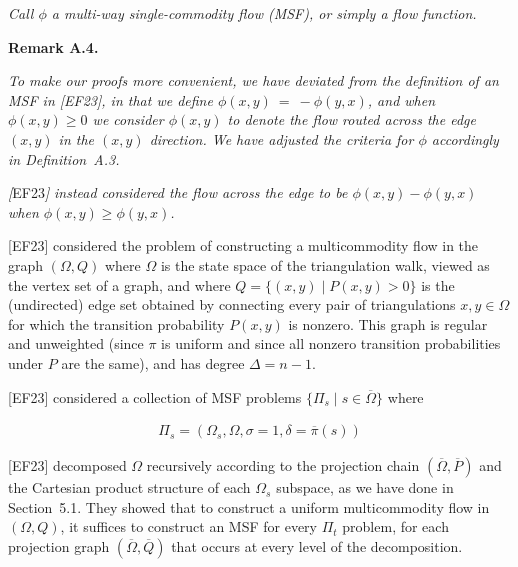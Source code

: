 \documentclass[10pt,a4paper]{article}
\begin{document}
\emph{Call $\phi$ a multi-way single-commodity flow (MSF), or simply a flow function.}\par







\par\medskip\noindent\textbf{\textbf{Remark A.4}\textbf{.}}\par



\emph{To make our proofs more convenient, we have deviated from the definition of an MSF in [EF23], in that we define $\phi(x,y)~=~-\phi(y,x)$, and when $\phi(x,y)\geq 0$ we consider $\phi(x,y)$ to denote the flow routed across the edge $(x,y)$ in the $(x,y)$ direction. We have adjusted the criteria for $\phi$ accordingly in Definition A.3.}\par




\emph{[}EF23\emph{]}\emph{ instead considered the flow across the edge to be $\phi(x,y)-\phi(y,x)$ when $\phi(x,y)\geq\phi(y,x)$.}\par






[EF23] considered the problem of constructing a multicommodity flow in the graph $(\Omega,Q)$ where $\Omega$ is the state space of the triangulation walk, viewed as the vertex set of a graph, and where $Q=\{(x,y)\mid P(x,y)>0\}$ is the (undirected) edge set obtained by connecting every pair of triangulations $x,y\in\Omega$ for which the transition probability $P(x,y)$ is nonzero. This graph is regular and unweighted (since $\pi$ is uniform and since all nonzero transition probabilities under $P$ are the same), and has degree $\Delta=n-1$.\par




[EF23] considered a collection of MSF problems $\{\Pi_{s}\mid s\in\overline{\Omega}\}$ where\par


\[\begin{gathered}
\Pi_{s}=\left(\Omega_{s},\Omega,\sigma=1,\delta=\overline{\pi}(s)\right)
\end{gathered}\]




[EF23] decomposed $\Omega$ recursively according to the projection chain $(\overline{\Omega},\overline{P})$ and the Cartesian product structure of each $\Omega_{s}$ subspace, as we have done in Section 5.1. They showed that to construct a uniform multicommodity flow in $(\Omega,Q)$, it suffices to construct an MSF for every $\Pi_{t}$ problem, for each projection graph $(\overline{\Omega},\overline{Q})$ that occurs at every level of the decomposition.\par
\end{document}
